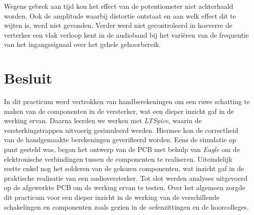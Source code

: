 \documentclass{report}
\begin{document}
\noindent Wegens gebrek aan tijd kon het effect van de potentiometer niet achterhaald worden. Ook de amplitude waarbij distortie ontstaat en aan welk effect dit te wijten is, werd niet gevonden. Verder werd niet gecontroleerd in hoeverre de verterker een vlak verloop kent in de audioband bij het variëren van de frequentie van het ingangssignaal over het gehele gehoorbereik.


\chapter{Besluit}
In dit practicum werd vertrokken van handberekeningen om een ruwe schatting te maken van de componenten in de versterker, wat een dieper inzicht gaf in de werking ervan. Daarna leerden we werken met \textit{LTSpice}, waarin de versterkingstrappen uitvoerig gesimuleerd werden. Hiermee kon de correctheid van de handgemaakte berekeningen geverifieerd worden. Eens de simulatie op punt gesteld was, begon het ontwerp van de PCB met behulp van \textit{Eagle} om de elektronische verbindingen tussen de componenten te realiseren. Uiteindelijk restte enkel nog het solderen van de gekozen componenten, wat inzicht gaf in de praktische realisatie van een audioversterker. Tot slot werden analyses uitgevoerd op de afgewerkte PCB om de werking ervan te testen. Over het algemeen zorgde dit practicum voor een dieper inzicht in de werking van de verschillende schakelingen en componenten zoals gezien in de oefenzittingen en de hoorcolleges.
\end{document}
